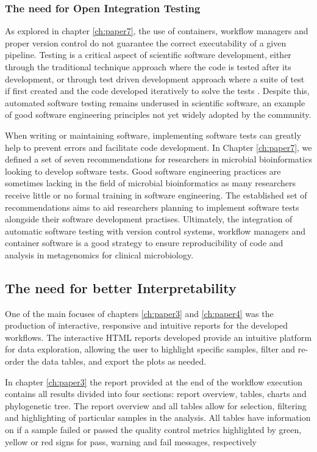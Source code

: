 \subsubsection{The need for Open Integration Testing }

As explored in chapter \ref{ch:paper7}, the use of containers, workflow managers and proper version control do not guarantee the correct executability of a given pipeline. Testing is a critical aspect of scientific software development, either through the traditional technique approach where the code is tested after its development, or through test driven development approach where a suite of test if first created and the code developed iteratively to solve the tests \citep{krafczyk_scientific_2019}. Despite this, automated software testing remains underused in scientific software, an example of good software engineering principles not yet widely adopted by the community. 

When writing or maintaining software, implementing software tests can greatly help to prevent errors and facilitate code development. In Chapter \ref{ch:paper7}, we defined a set of seven recommendations for researchers in microbial bioinformatics looking to develop software tests. Good software engineering practices are sometimes lacking in the field of microbial bioinformatics as many researchers receive little or no formal training in software engineering. The established set of recommendations aims to aid researchers planning to implement software tests alongside their software development practises. Ultimately, the integration of automatic software testing with version control systems, workflow managers and container software is a good strategy to ensure reproducibility of code and analysis in metagenomics for clinical microbiology. 

\subsection{The need for better Interpretability}

One of the main focuses of chapters \ref{ch:paper3} and \ref{ch:paper4} was the production of interactive, responsive and intuitive reports for the developed workflows. The interactive HTML reports developed provide an intuitive platform for data exploration, allowing the user to highlight specific samples, filter and re-order the data tables, and export the plots as needed. 

In chapter \ref{ch:paper3} the report provided at the end of the workflow execution contains all results divided into four sections: report overview, tables, charts and phylogenetic tree. The report overview and all tables allow for selection, filtering and highlighting of particular samples in the analysis. All tables have information on if a sample failed or passed the quality control metrics highlighted by green, yellow or red signs for pass, warning and fail messages, respectively

